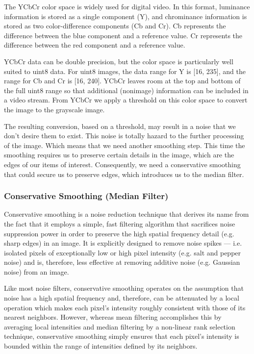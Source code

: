 The YCbCr color space is widely used for digital video. In this format, luminance information is 
stored as a single component (Y), and chrominance information is stored as two color-difference 
components (Cb and Cr). Cb represents the difference between the blue component and a 
reference value. Cr represents the difference between the red component and a reference value. \bigskip


YCbCr data can be double precision, but the color space is particularly well suited 
to uint8 data. For uint8 images, the data range for Y is [16, 235], and the range for Cb and Cr is 
[16, 240]. YCbCr leaves room at the top and bottom of the full uint8 range so that additional 
(nonimage) information can be included in a video stream. From YCbCr we apply a threshold 
on this color space to convert the image to the grayscale image.\bigskip

The resulting conversion, based on a threshold, may result in a noise that we don't desire them 
to exist. This noise is totally hazard to the further processing of the image. Which means that 
we need another smoothing step. This time the smoothing requires us to preserve certain details 
in the image, which are the edges of our items of interest. Consequently, we need a conservative 
smoothing that could secure us to preserve edges, which introduces us to the median filter.\bigskip

\subsubsection{Conservative Smoothing (Median Filter)} 
Conservative smoothing is a noise reduction technique that derives its name from the fact that it 
employs a simple, fast filtering algorithm that sacrifices noise suppression power in order to 
preserve the high spatial frequency detail (e.g. sharp edges) in an image. It is explicitly designed 
to remove noise spikes --- i.e. isolated pixels of exceptionally low or high pixel intensity (e.g. salt 
and pepper noise) and is, therefore, less effective at removing additive noise (e.g. Gaussian noise) 
from an image.  \bigskip

Like most noise filters, conservative smoothing operates on the assumption that noise has a 
high spatial frequency and, therefore, can be attenuated by a local operation which makes each 
pixel's intensity roughly consistent with those of its nearest neighbors. However, whereas mean 
filtering accomplishes this by averaging local intensities and median filtering by a non-linear 
rank selection technique, conservative smoothing simply ensures that each pixel's intensity is 
bounded within the range of intensities defined by its neighbors.  \bigskip

